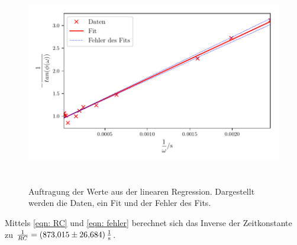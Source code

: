 \begin{figure}
  \centering
  \includegraphics[width=13cm, height=9cm]{build/plotc.pdf}
  \caption{Auftragung der Werte aus der linearen Regression. Dargestellt werden die Daten, ein Fit und der Fehler des Fits.}
  \label{fig:plotc}
\end{figure}

\noindent Mittels \eqref{eqn: RC} und \eqref{eqn: fehler} berechnet sich das Inverse der Zeitkonstante zu
$\frac{1}{RC} = \SI[per-mode=fraction]{873.015 \pm 26.684}{\per\second}$.

